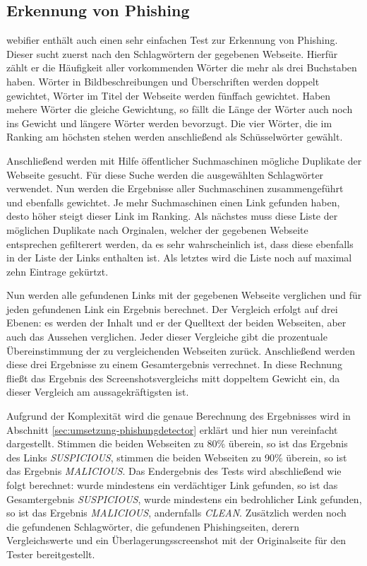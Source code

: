 \subsection{Erkennung von Phishing}

webifier enthält auch einen sehr einfachen Test zur Erkennung von Phishing. Dieser sucht zuerst nach den Schlagwörtern der gegebenen Webseite. Hierfür zählt er die Häufigkeit aller vorkommenden Wörter die mehr als drei Buchstaben haben. Wörter in Bildbeschreibungen und Überschriften werden doppelt gewichtet, Wörter im Titel der Webseite werden fünffach gewichtet. Haben mehere Wörter die gleiche Gewichtung, so fällt die Länge der Wörter auch noch ins Gewicht und längere Wörter werden bevorzugt. Die vier Wörter, die im Ranking am höchsten stehen werden anschließend als Schüsselwörter gewählt.

Anschließend werden mit Hilfe öffentlicher Suchmaschinen mögliche Duplikate der Webseite gesucht. Für diese Suche werden die ausgewählten Schlagwörter verwendet. Nun werden die Ergebnisse aller Suchmaschinen zusammengeführt und ebenfalls gewichtet. Je mehr Suchmaschinen einen Link gefunden haben, desto höher steigt dieser Link im Ranking. Als nächstes muss diese Liste der möglichen Duplikate nach Orginalen, welcher der gegebenen Webseite entsprechen gefilterert werden, da es sehr wahrscheinlich ist, dass diese ebenfalls in der Liste der Links enthalten ist. Als letztes wird die Liste noch auf maximal zehn Eintrage gekürtzt.

Nun werden alle gefundenen Links mit der gegebenen Webseite verglichen und für jeden gefundenen Link ein Ergebnis berechnet. Der Vergleich erfolgt auf drei Ebenen: es werden der Inhalt und er der Quelltext der beiden Webseiten, aber auch das Aussehen verglichen. Jeder dieser Vergleiche gibt die prozentuale Übereinstimmung der zu vergleichenden Webseiten zurück. Anschließend werden diese drei Ergebnisse zu einem Gesamtergebnis verrechnet. In diese Rechnung fließt das Ergebnis des Screenshotsvergleichs mitt doppeltem Gewicht ein, da dieser Vergleich am aussagekräftigsten ist.

Aufgrund der Komplexität wird die genaue Berechnung des Ergebnisses wird in Abschnitt \ref{sec:umsetzung-phishungdetector} erklärt und hier nun vereinfacht dargestellt. Stimmen die beiden Webseiten zu 80\% überein, so ist das Ergebnis des Links \textit{SUSPICIOUS}, stimmen die beiden Webseiten zu 90\% überein, so ist das Ergebnis \textit{MALICIOUS}. Das Endergebnis des Tests wird abschließend wie folgt berechnet: wurde mindestens ein verdächtiger Link gefunden, so ist das Gesamtergebnis \textit{SUSPICIOUS}, wurde mindestens ein bedrohlicher Link gefunden, so ist das Ergebnis \textit{MALICIOUS}, andernfalls \textit{CLEAN}. Zusätzlich werden noch die gefundenen Schlagwörter, die gefundenen Phishingseiten, derern Vergleichswerte und ein Überlagerungsscreenshot mit der Originalseite für den Tester bereitgestellt.

